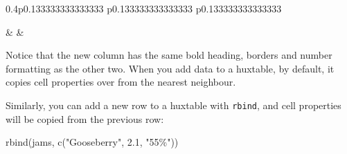 \documentclass[
]{article}
\newenvironment{Shaded}{\begin{snugshade}}{\end{snugshade}}
\newcommand{\FloatTok}[1]{\textcolor[rgb]{0.00,0.00,0.81}{#1}}
\newcommand{\FunctionTok}[1]{\textcolor[rgb]{0.00,0.00,0.00}{#1}}
\newcommand{\NormalTok}[1]{#1}
\newcommand{\StringTok}[1]{\textcolor[rgb]{0.31,0.60,0.02}{#1}}
\begin{document}
\begin{table}[ht]
\begin{centerbox}
\begin{threeparttable}
\begin{tabularx}{0.4\textwidth}{p{} p{} p{}}
\hhline{}

 &
 &
 \tabularnewline[-0.5pt]


\hhline{}
\end{tabularx}
\end{threeparttable}\par\end{centerbox}

\end{table}
 

\FloatBarrier

Notice that the new column has the same bold heading, borders and number
formatting as the other two. When you add data to a huxtable, by
default, it copies cell properties over from the nearest neighbour.

Similarly, you can add a new row to a huxtable with \texttt{rbind}, and
cell properties will be copied from the previous row:

\begin{Shaded}
\begin{Highlighting}[]
\FunctionTok{rbind}\NormalTok{(jams, }\FunctionTok{c}\NormalTok{(}\StringTok{"Gooseberry"}\NormalTok{, }\FloatTok{2.1}\NormalTok{, }\StringTok{"55\%"}\NormalTok{))}
\end{Highlighting}
\end{Shaded}

 
  \providecommand{\huxb}[2]{\arrayrulecolor[RGB]{#1}\global\arrayrulewidth=#2pt}
  \providecommand{\huxvb}[2]{\color[RGB]{#1}\vrule width #2pt}
  \providecommand{\huxtpad}[1]{\rule{0pt}{#1}}
  \providecommand{\huxbpad}[1]{\rule[-#1]{0pt}{#1}}
\end{document}
